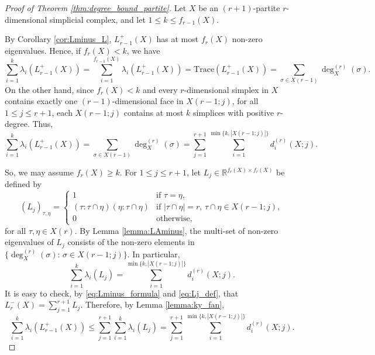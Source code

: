 \documentclass[a4paper,11pt]{article}
\theoremstyle{plain}
\theoremstyle{definition}
\numberwithin{theorem}{section}
\numberwithin{equation}{section}
\newcommand{\Rea}{{\mathbb R}}
\begin{document}
\begin{proof}[Proof of Theorem \ref{thm:degree_bound_partite}]
Let $X$ be an $(r+1)$-partite $r$-dimensional simplicial complex, and let $1\le k\le f_{r-1}(X)$.

By Corollary \ref{cor:Lminus_L}, $L_{r-1}^+(X)$ has at most $f_r(X)$ non-zero eigenvalues. Hence, if $f_r(X)<k$, we have
\[
   \sum_{i=1}^k \lambda_i(L_{r-1}^+(X)) = \sum_{i=1}^{f_{r-1}(X)}\lambda_i(L_{r-1}^+(X)) = \text{Trace}(L_{r-1}^{+}(X))= \sum_{\sigma\in X(r-1)}\deg_{X}^{(r)}(\sigma).
\]
On the other hand, since $f_r(X)<k$ and every $r$-dimensional simplex in $X$ contains exactly one $(r-1)$-dimensional face in $X(r-1;j)$, for all $1\le j\le r+1$, each $X(r-1;j)$ contains at most $k$ simplices with positive $r$-degree. Thus,
\[
     \sum_{i=1}^k \lambda_i(L_{r-1}^+(X)) = \sum_{\sigma\in X(r-1)}\deg_{X}^{(r)}(\sigma)=\sum_{j=1}^{r+1} \sum_{i=1}^{\min\{k,|X(r-1;j)|\}} d_i^{(r)}(X;j).
\]

So, we may assume $f_r(X)\ge k$. 
For $1\le j\le r+1$, let $L_j\in \Rea^{f_{r}(X)\times f_r(X)}$ be defined by
\begin{equation}\label{eq:Lj_def}
    (L_j)_{\tau,\eta}=\begin{cases}
    1 & \text{if } \tau=\eta, \\
    (\tau:\tau\cap \eta)(\eta:\tau\cap \eta) & \text{if } |\tau\cap \eta|=r,\, \tau\cap \eta\in X(r-1;j),\\
    0 & \text{otherwise,}
    \end{cases}
\end{equation}
for all $\tau,\eta\in X(r)$. By Lemma \ref{lemma:LAminus}, the multi-set of non-zero eigenvalues of $L_j$ consists of the non-zero elements in $\{\deg_X^{(r)}(\sigma):\, \sigma\in X(r-1;j)\}$. In particular,
\[
    \sum_{i=1}^{k} \lambda_i(L_j) = \sum_{i=1}^{\min\{k,|X(r-1;j)|\}} d_i^{(r)}(X;j).
\]
It is easy to check, by \eqref{eq:Lminus_formula} and \eqref{eq:Lj_def}, that $L^-_r(X)= \sum_{j=1}^{r+1}L_j$. Therefore, by Lemma \ref{lemma:ky_fan},
    \[
        \sum_{i=1}^k \lambda_i(L^+_{r-1}(X))\le
        \sum_{j=1}^{r+1} \sum_{i=1}^{k} \lambda_i(L_j)
        =\sum_{j=1}^{r+1} \sum_{i=1}^{\min\{k,|X(r-1;j)|\}} d_{i}^{(r)}(X;j).
    \]

\end{proof}
\end{document}
